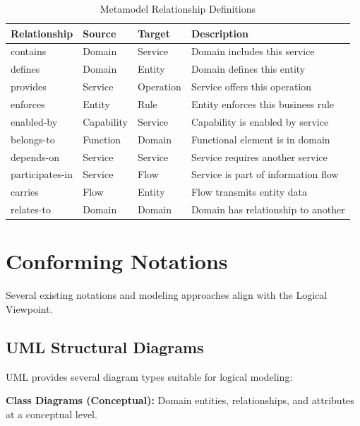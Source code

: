 \documentclass[11pt,letterpaper]{article}
\begin{document}
\begin{table}[H]
\centering
\caption{Metamodel Relationship Definitions}
\small
\begin{tabular}{@{}L{2.3cm}L{1.8cm}L{1.8cm}L{7.5cm}@{}}
\toprule
\textbf{Relationship} & \textbf{Source} & \textbf{Target} & \textbf{Description} \\
\midrule
contains & Domain & Service & Domain includes this service \\
\addlinespace
defines & Domain & Entity & Domain defines this entity \\
\addlinespace
provides & Service & Operation & Service offers this operation \\
\addlinespace
enforces & Entity & Rule & Entity enforces this business rule \\
\addlinespace
enabled-by & Capability & Service & Capability is enabled by service \\
\addlinespace
belongs-to & Function & Domain & Functional element is in domain \\
\addlinespace
depends-on & Service & Service & Service requires another service \\
\addlinespace
participates-in & Service & Flow & Service is part of information flow \\
\addlinespace
carries & Flow & Entity & Flow transmits entity data \\
\addlinespace
relates-to & Domain & Domain & Domain has relationship to another \\
\bottomrule
\end{tabular}
\end{table}

\section{Conforming Notations}

Several existing notations and modeling approaches align with the Logical Viewpoint.

\subsection{UML Structural Diagrams}

UML provides several diagram types suitable for logical modeling:

\textbf{Class Diagrams (Conceptual):} Domain entities, relationships, and attributes at a conceptual level.
\end{document}
